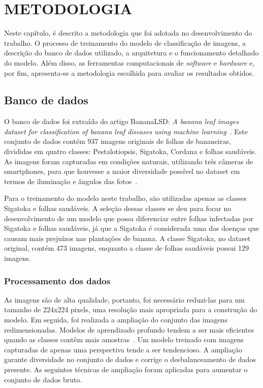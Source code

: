 

\chapter{METODOLOGIA}{}
\label{cap:04}

Neste capítulo, é descrito a metodologia que foi adotada no desenvolvimento do trabalho. O processo de treinamento do modelo de classificação de imagens, a descrição do banco de dados utilizado, a arquitetura e o funcionamento detalhado do modelo. Além disso, as ferramentas computacionais de \textit{software} e \textit{hardware} e, por fim, apresenta-se a metodologia escolhida para avaliar os resultados obtidos.

\section{Banco de dados}

O banco de dados foi extraído do artigo BananaLSD: \textit{A banana leaf images dataset for classification of banana leaf diseases using machine learning}~\cite{DadosArt}. Este conjunto de dados contém 937 imagens originais de folhas de bananeiras, divididas em quatro classes: Pestalotiopsis, Sigatoka, Cordana e folhas saudáveis. As imagens foram capturadas em condições naturais, utilizando três câmeras de smartphones, para que houvesse a maior diversidade possível no dataset em termos de iluminação e ângulos das fotos~\cite{DadosArt}.

Para o treinamento do modelo neste trabalho, são utilizadas apenas as classes Sigatoka e folhas saudáveis. A seleção dessas classes se deu para focar no desenvolvimento de um modelo que possa diferenciar entre folhas infectadas por Sigatoka e folhas saudáveis, já que a Sigatoka é considerada uma das doenças que causam mais prejuízos nas plantações de banana. A classe Sigatoka, no dataset original, contém 473 imagens, enquanto a classe de folhas saudáveis possui 129 imagens. 

\subsection{Processamento dos dados}
As imagens são de alta qualidade, portanto, foi necessário reduzi-las para um tamanho de 224x224 pixels, uma resolução mais apropriada para a construção do modelo. Em seguida, foi realizada a ampliação do conjunto das imagens redimensionadas. Modelos de aprendizado profundo tendem a ser mais eficientes quando as classes contêm mais amostras~\cite{DadosArt}. Um modelo treinado com imagens capturadas de apenas uma perspectiva tende a ser tendencioso. A ampliação garante diversidade no conjunto de dados e corrige o desbalanceamento de dados presente. As seguintes técnicas de ampliação foram aplicadas para aumentar o conjunto de dados bruto.

